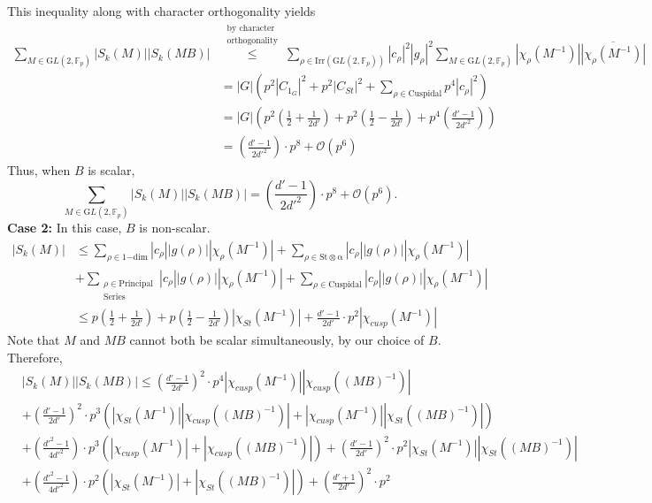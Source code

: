 \documentclass[12pt,reqno]{amsart}
\theoremstyle{plain}
\theoremstyle{definition}
\newcommand{\GL}{{\mathrm GL}}
\newcommand{\sO}{{\mathcal O}}
\theoremstyle{remark}
\newcommand{\FF}{\mathbb{F}}
\begin{document}
This inequality along with character orthogonality yields
\begin{align*}
    \sum_{M \in \GL(2, \FF_p)}|S_k(M)||S_k(MB)|&\overset{\substack{\text{by character} \\ \text{orthogonality}}}{\leq} \sum_{\rho \in \mathrm{Irr}(\GL(2, \FF_p))}|c_{\rho}|^2|g_{\rho}|^2\sum_{M \in \GL(2, \FF_p)}|\chi_\rho(M^{-1})|\overline{|\chi_\rho(M^{-1})|} \\
    &= |G|\left(p^2|C_{1_G}|^2 + p^2|C_{St}|^2+ \sum_{\rho \in \mathrm{Cuspidal}}p^4|c_{\rho}|^2\right)\\
    &=|G|\left(p^2\left(\frac{1}{2}+\frac{1}{2d'}\right)+p^2\left(\frac{1}{2}-\frac{1}{2d'}\right)+p^4\left(\frac{d'-1}{2d'^2}\right)\right)\\
    &= \left(\frac{d'-1}{2d'^2}\right)\cdot p^8 + \sO(p^6)
\end{align*}
Thus, when $B$ is scalar,
\begin{equation}\label{eq: nonsingular count for scalar B}
     \sum_{M \in \GL(2, \FF_p)}|S_k(M)||S_k(MB)|= \left(\frac{d'-1}{2d'^2}\right)\cdot p^8 + \sO(p^6).
\end{equation}
\textbf{Case 2:} In this case, $B$ is non-scalar.
  \begin{align*}
     |S_k(M)| &\leq \sum_{\rho \in 1\mathrm{-dim}}|c_{\rho}||g(\rho)||\chi_\rho(M^{-1})| +  \sum_{\rho \in \mathrm{St \otimes \alpha}}|c_{\rho}||g(\rho)||\chi_\rho(M^{-1})| \\
     &+\sum_{\substack{\rho \in  \mathrm{Principal}\\ \mathrm{Series}}}|c_{\rho}||g(\rho)||\chi_\rho(M^{-1})|+\sum_{\rho \in \mathrm{Cuspidal}}|c_{\rho}||g(\rho)||\chi_\rho(M^{-1})|\\&\leq p\left(\frac{1}{2}+\frac{1}{2d'}\right)+p\left(\frac{1}{2}-\frac{1}{2d'}\right)|\chi_{St}(M^{-1})|+ {\frac{d' -1}{2d'}}\cdot p^2|\chi_{cusp}(M^{-1})|
\end{align*}
Note that $M$ and $MB$ cannot both be scalar simultaneously, by our choice of $B$. Therefore, 
\begin{align*}
    &|S_k(M)||S_k(MB)| \leq  \left({\frac{d' -1}{2d'}}\right)^2\cdot p^4|\chi_{cusp}(M^{-1})||\chi_{cusp}((MB)^{-1})|\\  
    &+\left({\frac{d' -1}{2d'}}\right)^2\cdot p^3\left(|\chi_{St}(M^{-1})||\chi_{cusp}((MB)^{-1})| + |\chi_{cusp}(M^{-1})||\chi_{St}((MB)^{-1})|\right) \\
    &+\left({\frac{d'^2 -1}{4d'^2}}\right)\cdot p^3\left(|\chi_{cusp}(M^{-1})| +|\chi_{cusp}((MB)^{-1})|\right) +\left({\frac{d' -1}{2d'}}\right)^2\cdot p^2|\chi_{St}(M^{-1})||\chi_{St}((MB)^{-1})|\\
    &+\left({\frac{d'^2 -1}{4d'^2}}\right)\cdot p^2\left(|\chi_{St}(M^{-1})| +|\chi_{St}((MB)^{-1})|\right) +\left({\frac{d' +1}{2d'}}\right)^2\cdot p^2 
\end{align*}
\end{document}
